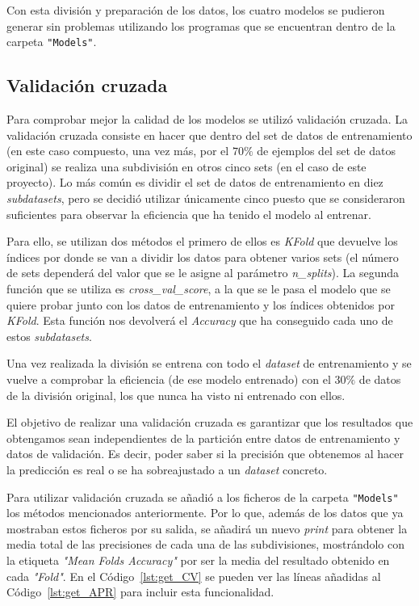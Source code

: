 \documentclass[a4paper, 12pt]{book}
\begin{document}
Con esta división y preparación de los datos, los cuatro modelos se pudieron generar sin problemas utilizando los programas que se encuentran dentro de la carpeta \texttt{"Models"}.  


\subsection{Validación cruzada}

Para comprobar mejor la calidad de los modelos se utilizó validación cruzada. La validación cruzada consiste en hacer que dentro del set de datos de entrenamiento (en este caso compuesto, una vez más, por el $70\%$ de ejemplos del set de datos original) se realiza una subdivisión en otros cinco sets (en el caso de este proyecto). Lo más común es dividir el set de datos de entrenamiento en diez \textit{subdatasets}, pero se decidió utilizar únicamente cinco puesto que se consideraron suficientes para observar la eficiencia que ha tenido el modelo al entrenar. 

Para ello, se utilizan dos métodos el primero de ellos es \textit{KFold} que devuelve los índices por donde se van a dividir los datos para obtener varios sets (el número de sets dependerá del valor que se le asigne al parámetro \textit{n\_splits}). La segunda función que se utiliza es \textit{cross\_val\_score}, a la que se le pasa el modelo que se quiere probar junto con los datos de entrenamiento y los índices obtenidos por \textit{KFold}. Esta función nos devolverá el \textit{Accuracy} que ha conseguido cada uno de estos \textit{subdatasets}.

Una vez realizada la división se entrena con todo el \textit{dataset} de entrenamiento y se vuelve a comprobar la eficiencia (de ese modelo entrenado) con el $30\%$ de datos de la división original, los que nunca ha visto ni entrenado con ellos.

El objetivo de realizar una validación cruzada es garantizar que los resultados que obtengamos sean independientes de la partición entre datos de entrenamiento y datos de validación. Es decir, poder saber si la precisión que obtenemos al hacer la predicción es real o se ha sobreajustado a un \textit{dataset} concreto.
 
 Para utilizar validación cruzada se añadió a los ficheros de la carpeta \texttt{"Models"} los métodos mencionados anteriormente. Por lo que, además de los datos que ya mostraban estos ficheros por su salida, se añadirá un nuevo \textit{print} para obtener la media total de las precisiones de cada una de las subdivisiones, mostrándolo con la etiqueta \textit{"Mean Folds Accuracy"} por ser la media del resultado obtenido en cada \textit{"Fold"}. En el Código~\ref{lst:get_CV} se pueden ver las líneas añadidas al Código~\ref{lst:get_APR} para incluir esta funcionalidad.
 
\end{document}
